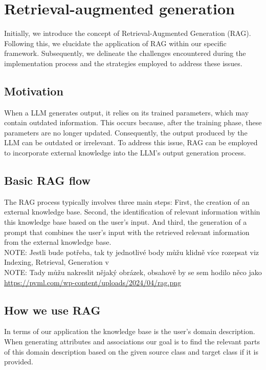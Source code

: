 \chapter{Retrieval-augmented generation}
Initially, we introduce the concept of Retrieval-Augmented Generation (RAG). Following this, we elucidate the application of RAG within our specific framework. Subsequently, we delineate the challenges encountered during the implementation process and the strategies employed to address these issues.

\section{Motivation}
When a LLM generates output, it relies on its trained parameters, which may contain outdated information. This occurs because, after the training phase, these parameters are no longer updated. Consequently, the output produced by the LLM can be outdated or irrelevant. To address this issue, RAG can be employed to incorporate external knowledge into the LLM's output generation process.

\section{Basic RAG flow}
The RAG process typically involves three main steps: First, the creation of an external knowledge base. Second, the identification of relevant information within this knowledge base based on the user's input. And third, the generation of a prompt that combines the user's input with the retrieved relevant information from the external knowledge base. \cite{Gao2023} \\

NOTE: Jestli bude potřeba, tak ty jednotlivé body můžu klidně více rozepsat viz Indexing, Retrieval, Generation v \cite{Gao2023} \\

NOTE: Tady můžu nakreslit nějaký obrázek, obsahově by se sem hodilo něco jako \url{https://pvml.com/wp-content/uploads/2024/04/rag.png}


\section{How we use RAG}
In terms of our application the knowledge base is the user's domain description. When generating attributes and associations our goal is to find the relevant parts of this domain description based on the given source class and target class if it is provided.

